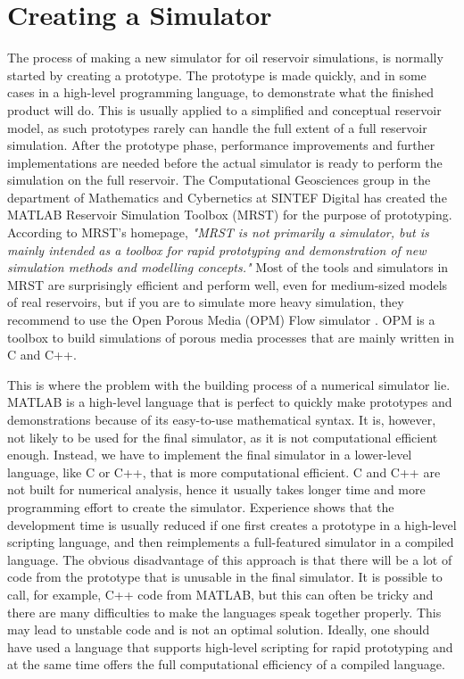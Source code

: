 \section{Creating a Simulator}
The process of making a new simulator for oil reservoir simulations, is normally started by creating a prototype. The prototype is made quickly, and in some cases in a high-level programming language, to demonstrate what the finished product will do. This is usually applied to a simplified and conceptual reservoir model, as such prototypes rarely can handle the full extent of a full reservoir simulation. After the prototype phase, performance improvements and further implementations are needed before the actual simulator is ready to perform the simulation on the full reservoir. The Computational Geosciences group in the department of Mathematics and Cybernetics at SINTEF Digital has created the MATLAB Reservoir Simulation Toolbox (MRST) \emph{\citep{mrstHomepage}} for the  purpose of prototyping. According to MRST's homepage, \textit{"MRST is not primarily a simulator, but is mainly intended as a toolbox for rapid prototyping and demonstration of new simulation methods and modelling concepts."} Most of the tools and simulators in MRST are surprisingly efficient and perform well, even for medium-sized models of real reservoirs, but if you are to simulate more heavy simulation, they recommend to use the Open Porous Media (OPM) Flow simulator \emph{\citep{OPM}}. OPM is a toolbox to build simulations of porous media processes that are mainly written in C and C++. 

This is where the problem with the building process of a numerical simulator lie. MATLAB is a high-level language that is perfect to quickly make prototypes and demonstrations because of its easy-to-use mathematical syntax. It is, however, not likely to be used for the final simulator, as it is not computational efficient enough. Instead, we have to implement the final simulator in a lower-level language, like C or C++, that is more computational efficient. C and C++ are not built for numerical analysis, hence it usually takes longer time and more programming effort to create the simulator. Experience shows that the development time is usually reduced if one first creates a prototype in a high-level scripting language, and then reimplements a full-featured simulator in a compiled language. The obvious disadvantage of this approach is that there will be a lot of code from the prototype that is unusable in the final simulator. It is possible to call, for example, C++ code from MATLAB, but this can often be tricky and there are many difficulties to make the languages speak together properly. This may lead to unstable code and is not an optimal solution. Ideally, one should have used a language that supports high-level scripting for rapid prototyping and at the same time offers the full computational efficiency of a compiled language.

